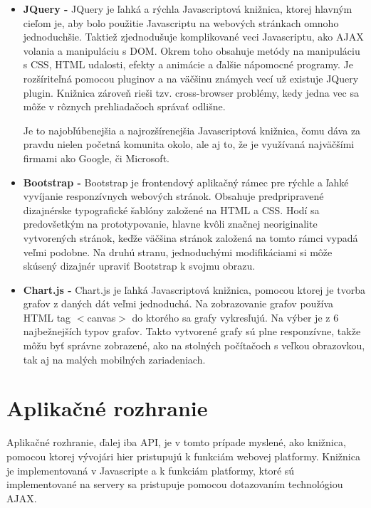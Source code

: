 \begin{itemize}
\item \textbf{JQuery -} JQuery je ľahká a rýchla Javascriptová knižnica, ktorej hlavným cieľom je, aby bolo použitie Javascriptu na webových stránkach omnoho jednoduchšie. Taktiež zjednodušuje komplikované veci Javascriptu, ako AJAX volania a manipuláciu s DOM. Okrem toho obsahuje metódy na manipuláciu s CSS, HTML udalosti, efekty a animácie a ďalšie nápomocné programy. Je rozšíriteľná pomocou pluginov a na väčšinu známych vecí už existuje JQuery plugin. Knižnica zároveň rieši tzv. cross-browser problémy, kedy jedna vec sa môže v rôznych prehliadačoch správať odlišne.

Je to najobľúbenejšia a najrozšírenejšia Javascriptová knižnica, čomu dáva za pravdu nielen početná komunita okolo, ale aj to, že je využívaná najväčšími firmami ako Google, či Microsoft.

\item \textbf{Bootstrap -} Bootstrap je frontendový aplikačný rámec pre rýchle a ľahké vyvíjanie responzívnych webových stránok. Obsahuje predpripravené dizajnérske typografické šablóny založené na HTML a CSS. Hodí sa predovšetkým na prototypovanie, hlavne kvôli značnej neoriginalite vytvorených stránok, keďže väčšina stránok založená na tomto rámci vypadá veľmi podobne. Na druhú stranu, jednoduchými modifikáciami si môže skúsený dizajnér upraviť Bootstrap k svojmu obrazu.

\item \textbf{Chart.js -} Chart.js je ľahká Javascriptová knižnica, pomocou ktorej je tvorba grafov z daných dát veľmi jednoduchá. Na zobrazovanie grafov používa HTML tag $<$canvas$>$ do ktorého sa grafy vykresľujú. Na výber je z 6 najbežnejších typov grafov. Takto vytvorené grafy sú plne responzívne, takže môžu byť správne zobrazené, ako na stolných počítačoch s veľkou obrazovkou, tak aj na malých mobilných zariadeniach.

\end{itemize}

\section{Aplikačné rozhranie}
\label{sec:api}
Aplikačné rozhranie, ďalej iba API, je v tomto prípade myslené, ako knižnica, pomocou ktorej vývojári hier pristupujú k funkciám webovej platformy. Knižnica je implementovaná v Javascripte a k funkciám platformy, ktoré sú implementované na servery sa pristupuje pomocou dotazovaním technológiou AJAX.

